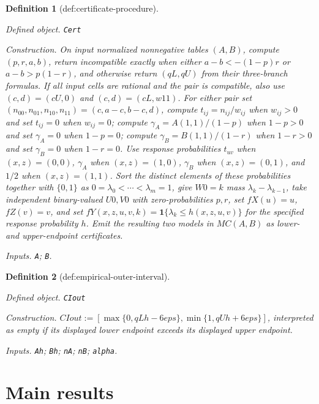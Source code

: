 \documentclass{article}
\newtheorem{definition}{Definition}
\begin{document}
\begin{definition}[def:certificate-procedure]\label{def:certificate-procedure}
\par\smallskip\noindent\emph{Defined object.} \texttt{Cert}
\par\smallskip\noindent\emph{Construction.} On input normalized nonnegative tables \((A,B)\), compute \((p,r,a,b)\), return incompatible exactly when either \(a-b<-(1-p)r\) or \(a-b>p(1-r)\), and otherwise return \((qL,qU)\) from their three-branch formulas.  If all input cells are rational and the pair is compatible, also use \((c,d)=(cU,0)\) and \((c,d)=(cL,w11)\).  For either pair set \((n_{00},n_{01},n_{10},n_{11})=(c,a-c,b-c,d)\), compute \(t_{ij}=n_{ij}/w_{ij}\) when \(w_{ij}>0\) and set \(t_{ij}=0\) when \(w_{ij}=0\); compute \(\gamma_A=A(1,1)/(1-p)\) when \(1-p>0\) and set \(\gamma_A=0\) when \(1-p=0\); compute \(\gamma_B=B(1,1)/(1-r)\) when \(1-r>0\) and set \(\gamma_B=0\) when \(1-r=0\).  Use response probabilities \(t_{uv}\) when \((x,z)=(0,0)\), \(\gamma_A\) when \((x,z)=(1,0)\), \(\gamma_B\) when \((x,z)=(0,1)\), and \(1/2\) when \((x,z)=(1,1)\).  Sort the distinct elements of these probabilities together with \(\{0,1\}\) as \(0=\lambda_0<\cdots<\lambda_m=1\), give \(W0=k\) mass \(\lambda_k-\lambda_{k-1}\), take independent binary-valued \(U0,V0\) with zero-probabilities \(p,r\), set \(fX(u)=u\), \(fZ(v)=v\), and set \(fY(x,z,u,v,k)=\mathbf 1\{\lambda_k\le h(x,z,u,v)\}\) for the specified response probability \(h\).  Emit the resulting two models in \(MC(A,B)\) as lower- and upper-endpoint certificates.
\par\smallskip\noindent\emph{Inputs.} \texttt{A}; \texttt{B}.
\end{definition}

\begin{definition}[def:empirical-outer-interval]\label{def:empirical-outer-interval}
\par\smallskip\noindent\emph{Defined object.} \texttt{CIout}
\par\smallskip\noindent\emph{Construction.} \(CIout:=[\max\{0,qLh-6eps\},\min\{1,qUh+6eps\}]\), interpreted as empty if its displayed lower endpoint exceeds its displayed upper endpoint.
\par\smallskip\noindent\emph{Inputs.} \texttt{Ah}; \texttt{Bh}; \texttt{nA}; \texttt{nB}; \texttt{alpha}.
\end{definition}

\section{Main results}
\end{document}
